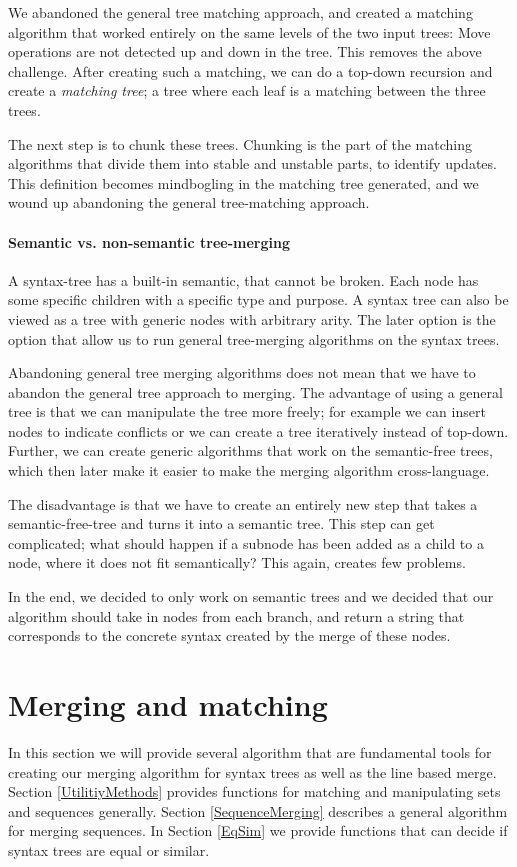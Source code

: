 \documentclass[11pt]{article}
\begin{document}
We abandoned the general tree matching approach, and created a matching algorithm that worked entirely on the same levels of the two input trees: Move operations are not detected up and down in the tree. This removes the above challenge. After creating such a matching, we can do a top-down recursion and create a \textit{matching tree}; a tree where each leaf is a matching between the three trees. 

The next step is to chunk these trees. Chunking is the part of the matching algorithms that divide them into stable and unstable parts, to identify updates. This definition becomes mindbogling in the matching tree generated, and we wound up abandoning the general tree-matching approach.
 
\paragraph{Semantic vs. non-semantic tree-merging} A syntax-tree has a built-in semantic, that cannot be broken. Each node has some specific children with a specific type and purpose. A syntax tree can also be viewed as a tree with generic nodes with arbitrary arity. The later option is the option that allow us to run general tree-merging algorithms on the syntax trees.

Abandoning general tree merging algorithms does not mean that we have to abandon the general tree approach to merging. The advantage of using a general tree is that we can manipulate the tree more freely; for example we can insert nodes to indicate conflicts or we can create a tree iteratively instead of top-down. Further, we can create generic algorithms that work on the semantic-free trees, which then later make it easier to make the merging algorithm cross-language.

The disadvantage is that we have to create an entirely new step that takes a semantic-free-tree and turns it into a semantic tree. This step can get complicated; what should happen if a subnode has been added as a child to a node, where it does not fit semantically? This again, creates few problems.

In the end, we decided to only work on semantic trees and we decided that our algorithm should take in nodes from each branch, and return a string that corresponds to the concrete syntax created by the merge of these nodes.

\clearpage

\section{Merging and matching}
In this section we will provide several algorithm that are fundamental tools for creating our merging algorithm for syntax trees as well as the line based merge. Section \ref{UtilitiyMethods} provides functions for matching and manipulating sets and sequences generally. Section \ref{SequenceMerging} describes a general algorithm for merging sequences.  In Section \ref{EqSim} we provide functions that can decide if syntax trees are equal or similar.
\end{document}
